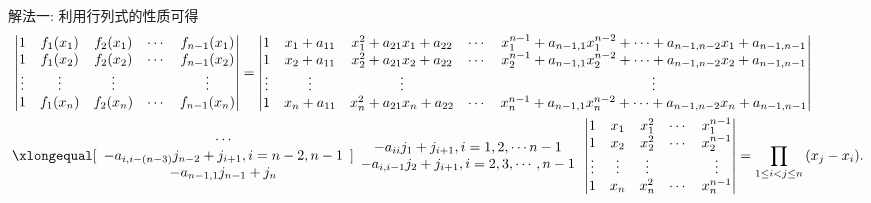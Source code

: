 \documentclass[../../main.tex]{subfiles}
\begin{document}
\begin{solution}
{\color{blue}解法一:}
利用行列式的性质可得
\begin{align*}
&\left| \begin{matrix}
1&		f_1(x_1)&		f_2(x_1)&		\cdots&		f_{n-1}(x_1)\\
1&		f_1(x_2)&		f_2(x_2)&		\cdots&		f_{n-1}(x_2)\\
\vdots&		\vdots&		\vdots&		&		\vdots\\
1&		f_1(x_n)&		f_2(x_n)&		\cdots&		f_{n-1}(x_n)\\
\end{matrix} \right|
=\left| \begin{matrix}
1&		x_1+a_{11}&		x_{1}^{2}+a_{21}x_1+a_{22}&		\cdots&		x_{1}^{n-1}+a_{n-1,1}x_{1}^{n-2}+\cdots +a_{n-1,n-2}x_1+a_{n-1,n-1}\\
1&		x_2+a_{11}&		x_{2}^{2}+a_{21}x_2+a_{22}&		\cdots&		x_{2}^{n-1}+a_{n-1,1}x_{2}^{n-2}+\cdots +a_{n-1,n-2}x_2+a_{n-1,n-1}\\
\vdots&		\vdots&		\vdots&		&		\vdots\\
1&		x_n+a_{11}&		x_{n}^{2}+a_{21}x_n+a_{22}&		\cdots&		x_{n}^{n-1}+a_{n-1,1}x_{n}^{n-2}+\cdots +a_{n-1,n-2}x_n+a_{n-1,n-1}\\
\end{matrix} \right|
\\
&\xlongequal[\begin{array}{c}
\cdots\\
-a_{i,i-\left( n-3 \right)}j_{n-2}+j_{i+1},i=n-2,n-1\\
-a_{n-1,1}j_{n-1}+j_n\\
\end{array}]{\begin{array}{c}
-a_{ii}j_1+j_{i+1},i=1,2,\cdots n-1\\
-a_{i,i-1}j_2+j_{i+1},i=2,3,\cdots ,n-1\\
\end{array}}\left| \begin{matrix}
1&		x_1&		x_{1}^{2}&		\cdots&		x_{1}^{n-1}\\
1&		x_2&		x_{2}^{2}&		\cdots&		x_{2}^{n-1}\\
\vdots&		\vdots&		\vdots&		&		\vdots\\
1&		x_n&		x_{n}^{2}&		\cdots&		x_{n}^{n-1}\\
\end{matrix} \right|=\prod_{1\le i<j\le n}{\left( x_j-x_i \right) }.
\end{align*}


\end{solution}
\end{document}
